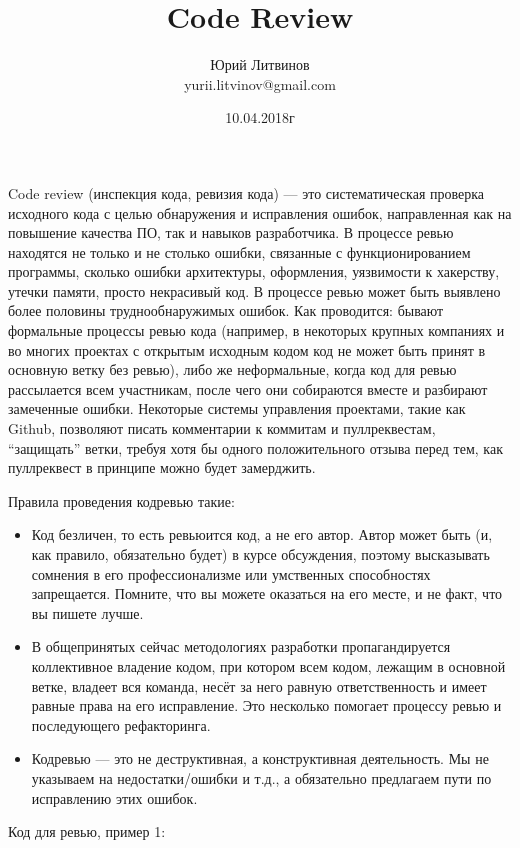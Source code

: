 \documentclass[a5paper]{article}
\title{Code Review}
\author{Юрий Литвинов\\\small{yurii.litvinov@gmail.com}}
\date{10.04.2018г}
\begin{document}
\maketitle
\thispagestyle{empty}

Code review (инспекция кода, ревизия кода) --- это систематическая проверка исходного кода с целью обнаружения и исправления ошибок, направленная как на повышение качества ПО, так и навыков разработчика. В процессе ревью находятся не только и не столько ошибки, связанные с функционированием программы, сколько ошибки архитектуры, оформления, уязвимости к хакерству, утечки памяти, просто некрасивый код. В процессе ревью может быть выявлено более половины труднообнаружимых ошибок. Как проводится: бывают формальные процессы ревью кода (например, в некоторых крупных компаниях и во многих проектах с открытым исходным кодом код не может быть принят в основную ветку без ревью), либо же неформальные, когда код для ревью рассылается всем участникам, после чего они собираются вместе и разбирают замеченные ошибки. Некоторые системы управления проектами, такие как Github, позволяют писать комментарии к коммитам и пуллреквестам, ``защищать'' ветки, требуя хотя бы одного положительного отзыва перед тем, как пуллреквест в принципе можно будет замерджить.

Правила проведения кодревью такие:
\begin{itemize}
    \item Код безличен, то есть ревьюится код, а не его автор. Автор может быть (и, как правило, обязательно будет) в курсе обсуждения, поэтому высказывать сомнения в его профессионализме или умственных способностях запрещается. Помните, что вы можете оказаться на его месте, и не факт, что вы пишете лучше.
    \item В общепринятых сейчас методологиях разработки пропагандируется коллективное владение кодом, при котором всем кодом, лежащим в основной ветке, владеет вся команда, несёт за него равную ответственность и имеет равные права на его исправление. Это несколько помогает процессу ревью и последующего рефакторинга.
    \item Кодревью --- это не деструктивная, а конструктивная деятельность. Мы не указываем на недостатки/ошибки и т.д., а обязательно предлагаем пути по исправлению этих ошибок.
\end{itemize}

Код для ревью, пример 1:
\end{document}
